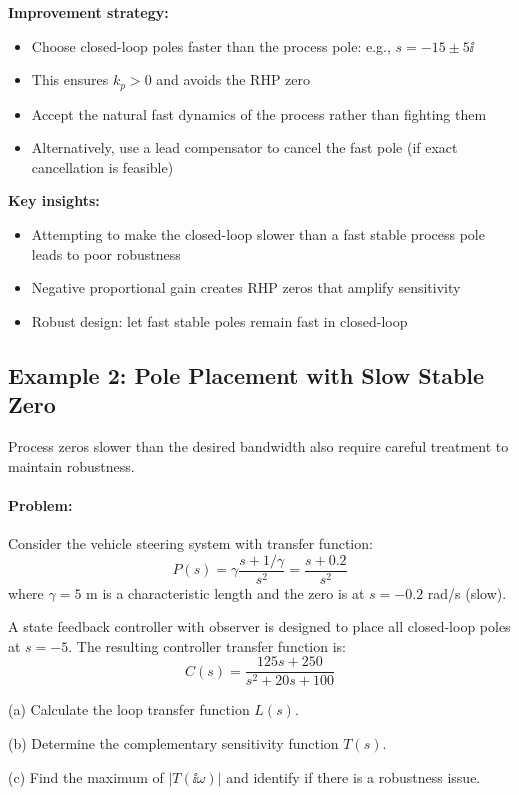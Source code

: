 \documentclass[11pt,a4paper]{article}
\begin{document}
\textbf{Improvement strategy:}
\begin{itemize}
\item Choose closed-loop poles faster than the process pole: e.g., $s = -15 \pm 5\ii$
\item This ensures $k_p > 0$ and avoids the RHP zero
\item Accept the natural fast dynamics of the process rather than fighting them
\item Alternatively, use a lead compensator to cancel the fast pole (if exact cancellation is feasible)
\end{itemize}

\textbf{Key insights:}
\begin{itemize}
\item Attempting to make the closed-loop slower than a fast stable process pole leads to poor robustness
\item Negative proportional gain creates RHP zeros that amplify sensitivity
\item Robust design: let fast stable poles remain fast in closed-loop
\end{itemize}

\subsection{Example 2: Pole Placement with Slow Stable Zero}

Process zeros slower than the desired bandwidth also require careful treatment to maintain robustness.

\paragraph{Problem:}
Consider the vehicle steering system with transfer function:
\[
P(s) = \gamma\frac{s + 1/\gamma}{s^2} = \frac{s + 0.2}{s^2}
\]
where $\gamma = 5$ m is a characteristic length and the zero is at $s = -0.2$ rad/s (slow).

A state feedback controller with observer is designed to place all closed-loop poles at $s = -5$. The resulting controller transfer function is:
\[
C(s) = \frac{125s + 250}{s^2 + 20s + 100}
\]

(a) Calculate the loop transfer function $L(s)$.

(b) Determine the complementary sensitivity function $T(s)$.

(c) Find the maximum of $|T(\ii\omega)|$ and identify if there is a robustness issue.
\end{document}

